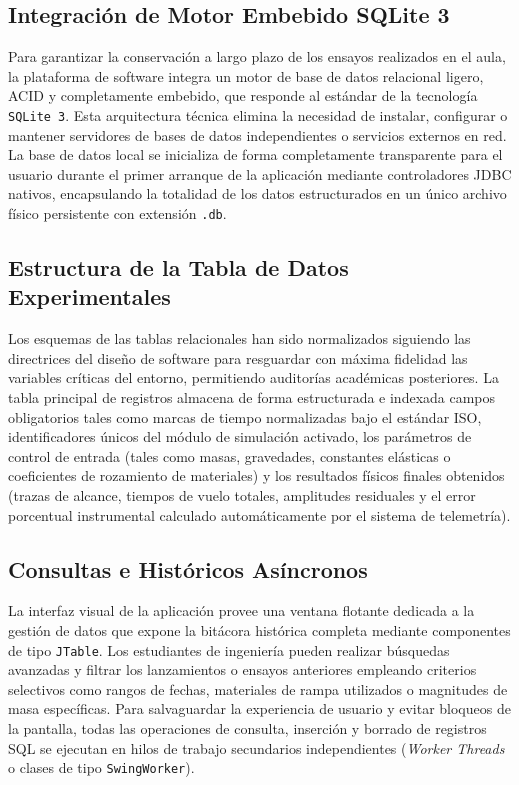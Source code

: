 \documentclass[11pt,a4paper]{article}
\begin{document}
	\subsection{Integración de Motor Embebido SQLite 3}
	Para garantizar la conservación a largo plazo de los ensayos realizados en el aula, la plataforma de software integra un motor de base de datos relacional ligero, ACID y completamente embebido, que responde al estándar de la tecnología \texttt{SQLite 3}. Esta arquitectura técnica elimina la necesidad de instalar, configurar o mantener servidores de bases de datos independientes o servicios externos en red. La base de datos local se inicializa de forma completamente transparente para el usuario durante el primer arranque de la aplicación mediante controladores JDBC nativos, encapsulando la totalidad de los datos estructurados en un único archivo físico persistente con extensión \texttt{.db}.
	
	\subsection{Estructura de la Tabla de Datos Experimentales}
	Los esquemas de las tablas relacionales han sido normalizados siguiendo las directrices del diseño de software para resguardar con máxima fidelidad las variables críticas del entorno, permitiendo auditorías académicas posteriores. La tabla principal de registros almacena de forma estructurada e indexada campos obligatorios tales como marcas de tiempo normalizadas bajo el estándar ISO, identificadores únicos del módulo de simulación activado, los parámetros de control de entrada (tales como masas, gravedades, constantes elásticas o coeficientes de rozamiento de materiales) y los resultados físicos finales obtenidos (trazas de alcance, tiempos de vuelo totales, amplitudes residuales y el error porcentual instrumental calculado automáticamente por el sistema de telemetría).
	
	\subsection{Consultas e Históricos Asíncronos}
	La interfaz visual de la aplicación provee una ventana flotante dedicada a la gestión de datos que expone la bitácora histórica completa mediante componentes de tipo \texttt{JTable}. Los estudiantes de ingeniería pueden realizar búsquedas avanzadas y filtrar los lanzamientos o ensayos anteriores empleando criterios selectivos como rangos de fechas, materiales de rampa utilizados o magnitudes de masa específicas. Para salvaguardar la experiencia de usuario y evitar bloqueos de la pantalla, todas las operaciones de consulta, inserción y borrado de registros SQL se ejecutan en hilos de trabajo secundarios independientes (\textit{Worker Threads} o clases de tipo \texttt{SwingWorker}).
	
\end{document}
